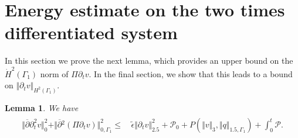 \documentclass[10pt,reqno]{amsart}
\theoremstyle{plain}
\newtheorem{lemma}[theorem]{Lemma}
\theoremstyle{definition}
\numberwithin{equation}{section}
\newcommand{\ccP}{\mathscr{P}}
\newcommand{\ccPz}{\mathscr{P}_0}
\newcommand{\Ga}{\Gamma}
\newcommand{\norm}[1]{\Vert#1\Vert}
\begin{document}
\section{Energy estimate on the two times differentiated system}\label{section_H_1_estimate}
In this section we prove the next lemma, which
provides an upper bound on the $\dot H^{2}(\Gamma_1)$ norm
of $\Pi\partial_{t} v$.
In the final section, we show that this leads to a bound 
on $\Vert \partial_{t}v\Vert_{H^{2}(\Gamma_1)}$.

\begin{lemma}
\label{L02}
We have
\begin{align}
\begin{split}
\norm{\overline{\partial} \partial^2_t v}_0^2 +  
\norm{ \overline{\partial}{}^2 (\Pi \partial_t v)}^2_{0,\Ga_1}
\leq & 
\,
\widetilde{\epsilon}  \norm{ \partial_t v}_{2.5}^2
+\ccPz
+ P( \norm{v}_3,\norm{q}_{1.5,\Ga_1})
+
\int_0^t \ccP.
\end{split}
\label{partial_2_t_v_estimate}
\end{align}
\end{lemma}
\end{document}

